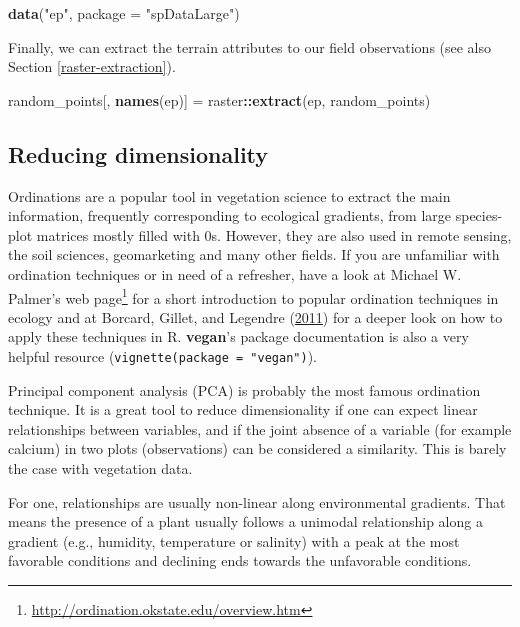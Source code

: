 \documentclass[]{krantz}
\newenvironment{Shaded}{\begin{snugshade}}{\end{snugshade}}
\newcommand{\DataTypeTok}[1]{\textcolor[rgb]{0.27,0.27,0.27}{#1}}
\newcommand{\KeywordTok}[1]{\textcolor[rgb]{0.27,0.27,0.27}{\textbf{#1}}}
\newcommand{\NormalTok}[1]{#1}
\newcommand{\OperatorTok}[1]{\textcolor[rgb]{0.43,0.43,0.43}{\textbf{#1}}}
\newcommand{\StringTok}[1]{\textcolor[rgb]{0.5,0.5,0.5}{#1}}
\let\rmarkdownfootnote\footnote%
\def\footnote{\protect\rmarkdownfootnote}
\renewcommand{\href}[2]{#2\footnote{\url{#1}}}
\begin{document}
\begin{Shaded}
\begin{Highlighting}[]
\KeywordTok{data}\NormalTok{(}\StringTok{"ep"}\NormalTok{, }\DataTypeTok{package =} \StringTok{"spDataLarge"}\NormalTok{)}
\end{Highlighting}
\end{Shaded}

Finally, we can extract the terrain attributes to our field observations (see also Section \ref{raster-extraction}).

\begin{Shaded}
\begin{Highlighting}[]
\NormalTok{random_points[, }\KeywordTok{names}\NormalTok{(ep)] =}\StringTok{ }\NormalTok{raster}\OperatorTok{::}\KeywordTok{extract}\NormalTok{(ep, random_points)}
\end{Highlighting}
\end{Shaded}

\hypertarget{nmds}{%
\subsection{Reducing dimensionality}\label{nmds}}

Ordinations are a popular tool in vegetation science to extract the main information, frequently corresponding to ecological gradients, from large species-plot matrices mostly filled with 0s.
However, they are also used in remote sensing, the soil sciences, geomarketing and many other fields.
If you are unfamiliar with ordination techniques or in need of a refresher, have a look at Michael W. Palmer's \href{http://ordination.okstate.edu/overview.htm}{web page} for a short introduction to popular ordination techniques in ecology and at Borcard, Gillet, and Legendre (\protect\hyperlink{ref-borcard_numerical_2011}{2011}) for a deeper look on how to apply these techniques in R.
\textbf{vegan}'s package documentation is also a very helpful resource (\texttt{vignette(package\ =\ "vegan")}).

Principal component analysis (PCA) is probably the most famous ordination technique.
It is a great tool to reduce dimensionality if one can expect linear relationships between variables, and if the joint absence of a variable (for example calcium) in two plots (observations) can be considered a similarity.
This is barely the case with vegetation data.

For one, relationships are usually non-linear along environmental gradients.
That means the presence of a plant usually follows a unimodal relationship along a gradient (e.g., humidity, temperature or salinity) with a peak at the most favorable conditions and declining ends towards the unfavorable conditions.
\end{document}
